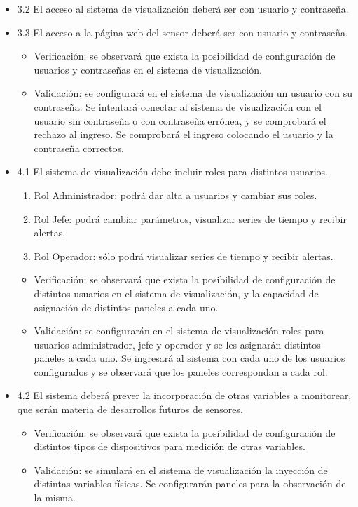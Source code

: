 \documentclass[11pt]{charter}
\begin{document}
\begin{itemize}
\item 3.2 El acceso al sistema de visualización deberá ser con usuario y contraseña.
\item 3.3 El acceso a la página web del sensor deberá ser con usuario y contraseña.
\begin{itemize}
\item Verificación: se observará que exista la posibilidad de configuración de usuarios y contraseñas en el sistema de visualización.
\item Validación: se configurará en el sistema de visualización un usuario con su contraseña. Se intentará conectar al sistema de visualización con el usuario sin contraseña o con contraseña errónea, y se comprobará el rechazo al ingreso. Se comprobará el ingreso colocando el usuario y la contraseña correctos.
\end{itemize}

\item 4.1 El sistema de visualización debe incluir roles para distintos usuarios.
		 \begin{enumerate}
		 \item Rol Administrador: podrá dar alta a usuarios y cambiar sus roles.
	     \item Rol Jefe: podrá cambiar parámetros, visualizar series de tiempo y recibir alertas.
	     \item Rol Operador: sólo podrá visualizar series de tiempo y recibir alertas.
	     \end{enumerate}
\begin{itemize}
\item Verificación: se observará que exista la posibilidad de configuración de distintos usuarios en el sistema de visualización, y la capacidad de asignación de distintos paneles a cada uno. 
\item Validación: se configurarán en el sistema de visualización roles para usuarios administrador, jefe y operador y se les asignarán distintos paneles a cada uno. Se ingresará al sistema con cada uno de los usuarios configurados y se observará que los paneles correspondan a cada rol.
\end{itemize}
	     
\item 4.2 El sistema deberá prever la incorporación de otras variables a monitorear, que serán materia de desarrollos futuros de sensores.
\begin{itemize}
\item Verificación: se observará que exista la posibilidad de configuración de distintos tipos de dispositivos para medición de otras variables. 
\item Validación: se simulará en el sistema de visualización la inyección de distintas variables físicas. Se configurarán paneles para la observación de la misma.
\end{itemize}


\end{itemize}
\end{document}
